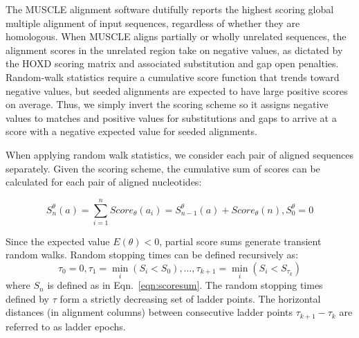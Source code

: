\documentclass[twoside,11pt]{article}
\begin{document}
The MUSCLE alignment software dutifully reports the highest scoring global multiple alignment of input sequences, regardless of whether they are homologous.  When MUSCLE aligns partially or wholly unrelated sequences, the alignment scores in the unrelated region take on negative values, as dictated by the HOXD scoring matrix and associated substitution and gap open penalties.  Random-walk statistics require a cumulative score function that trends toward negative values, but seeded alignments are expected to have large positive scores on average.  Thus, we simply invert the scoring scheme so it assigns negative values to matches and positive values for substitutions and gaps to arrive at a score with a negative expected value for seeded alignments.

When applying random walk statistics, we consider each pair of aligned sequences separately.  Given the scoring scheme, the cumulative sum of scores can be calculated for each pair of aligned nucleotides:

\begin{equation}
\label{eqn:scoresum}
S_n^\theta(a) = \sum_{i=1}^{n} Score_\theta(a_i) = S_{n-1}^\theta(a) + Score_\theta(n), S_0^\theta = 0
\end{equation}

Since the expected value $E(\theta) < 0$, partial score sums generate transient random walks.  Random stopping times can be defined recursively as:
\begin{equation}
\label{eqn:stoppingtimes}
\tau_0 = 0, \tau_1 = \min_i(S_i < S_0),\dots,\tau_{k+1} = \min_i(S_i < S_{\tau_k})
\end{equation}
where $S_n$ is defined as in Eqn.~\ref{eqn:scoresum}.  The random stopping times defined by $\tau$ form a strictly decreasing set of ladder points.  The horizontal distances (in alignment columns) between consecutive ladder points $\tau_{k+1}-\tau_{k}$ are referred to as ladder epochs.
\end{document}
